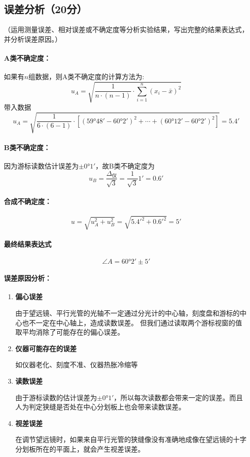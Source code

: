 \documentclass{../template/Report}%
\begin{document}
\subsection{误差分析（20分）}
（运用测量误差、相对误差或不确定度等分析实验结果，写出完整的结果表达式，并分析误差原因。）
\paragraph{A类不确定度：}
如果有$n$组数据，则A类不确定度的计算方法为:
\[
u_A = \sqrt{\dfrac{1}{n \cdot (n - 1)} \cdot \sum_{i = 1}^n (x_i - \bar{x})^2}
\]
带入数据
\[
u_A = \sqrt{\frac{1}{6 \cdot (6 - 1)} \cdot \left[(\ang{59;48} - \ang{60;2})^2 + \cdots + (\ang{60;12} - \ang{60;2})^2\right]} = \ang{;5.4;}
\]
\paragraph{B类不确定度：}
因为游标读数估计误差为$\pm\ang{0;1}$，故B类不确定度为
\[
u_B = \frac{\Delta_\text{仪}}{\sqrt{3}} = \frac{1}{\sqrt{3}}\ang{;1} = \ang{;0.6;}
\]
\paragraph{合成不确定度：}
\[
u = \sqrt{u_A^2 + u_B^2} = \sqrt{\ang{;5.4;}^2 + \ang{;0.6;}^2} = \ang{;5;}
\]
\paragraph{最终结果表达式}
\[\angle A = \ang{60;2} \pm \ang{;5;}\]
\paragraph{误差原因分析：}
\begin{enumerate}[label=原因\zhnum*：]
    \item \textbf{偏心误差}

    由于望远镜、平行光管的光轴不一定通过分光计的中心轴，刻度盘和游标的中心也不一定在中心轴上，造成读数误差。
    但我们通过读取两个游标视窗的值取平均消除了可能存在的偏心误差。
    \item \textbf{仪器可能存在的误差}

    如仪器老化、刻度不准、仪器热胀冷缩等
    \item \textbf{读数误差}

    由于游标读数的估计误差为$\pm\ang{0;1}$，所以每次读数都会带来一定的误差。而且人为判定狭缝是否处在中心分划板上也会带来读数误差。

    \item \textbf{视差误差}

    在调节望远镜时，如果来自平行光管的狭缝像没有准确地成像在望远镜的十字分划板所在的平面上，就会产生视差误差。

\end{enumerate}
\end{document}
